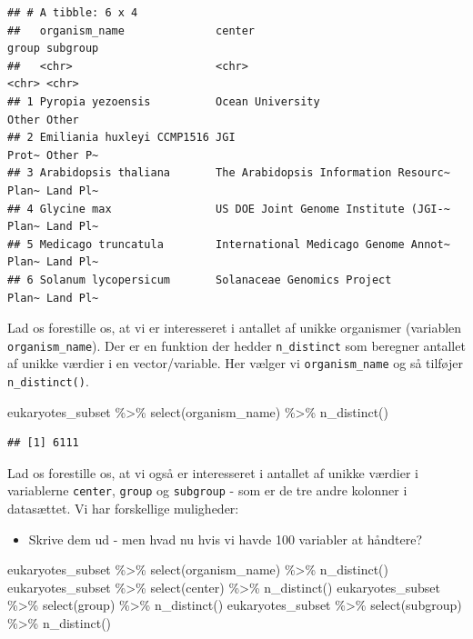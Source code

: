 \documentclass[
]{book}
\newenvironment{Shaded}{\begin{snugshade}}{\end{snugshade}}
\newcommand{\FunctionTok}[1]{\textcolor[rgb]{0.00,0.00,0.00}{#1}}
\newcommand{\NormalTok}[1]{#1}
\newcommand{\SpecialCharTok}[1]{\textcolor[rgb]{0.00,0.00,0.00}{#1}}
\providecommand{\tightlist}{%
  \setlength{\itemsep}{0pt}\setlength{\parskip}{0pt}}
\begin{document}
\begin{verbatim}
## # A tibble: 6 x 4
##   organism_name              center                               group subgroup
##   <chr>                      <chr>                                <chr> <chr>   
## 1 Pyropia yezoensis          Ocean University                     Other Other   
## 2 Emiliania huxleyi CCMP1516 JGI                                  Prot~ Other P~
## 3 Arabidopsis thaliana       The Arabidopsis Information Resourc~ Plan~ Land Pl~
## 4 Glycine max                US DOE Joint Genome Institute (JGI-~ Plan~ Land Pl~
## 5 Medicago truncatula        International Medicago Genome Annot~ Plan~ Land Pl~
## 6 Solanum lycopersicum       Solanaceae Genomics Project          Plan~ Land Pl~
\end{verbatim}

Lad os forestille os, at vi er interesseret i antallet af unikke organismer (variablen \texttt{organism\_name}). Der er en funktion der hedder \texttt{n\_distinct} som beregner antallet af unikke værdier i en vector/variable. Her vælger vi \texttt{organism\_name} og så tilføjer \texttt{n\_distinct()}.

\begin{Shaded}
\begin{Highlighting}[]
\NormalTok{eukaryotes\_subset }\SpecialCharTok{\%\textgreater{}\%} 
  \FunctionTok{select}\NormalTok{(organism\_name) }\SpecialCharTok{\%\textgreater{}\%} 
  \FunctionTok{n\_distinct}\NormalTok{()}
\end{Highlighting}
\end{Shaded}

\begin{verbatim}
## [1] 6111
\end{verbatim}

Lad os forestille os, at vi også er interesseret i antallet af unikke værdier i variablerne \texttt{center}, \texttt{group} og \texttt{subgroup} - som er de tre andre kolonner i datasættet. Vi har forskellige muligheder:

\begin{itemize}
\tightlist
\item
  Skrive dem ud - men hvad nu hvis vi havde 100 variabler at håndtere?
\end{itemize}

\begin{Shaded}
\begin{Highlighting}[]
\NormalTok{eukaryotes\_subset }\SpecialCharTok{\%\textgreater{}\%} \FunctionTok{select}\NormalTok{(organism\_name) }\SpecialCharTok{\%\textgreater{}\%} \FunctionTok{n\_distinct}\NormalTok{()}
\NormalTok{eukaryotes\_subset }\SpecialCharTok{\%\textgreater{}\%} \FunctionTok{select}\NormalTok{(center) }\SpecialCharTok{\%\textgreater{}\%} \FunctionTok{n\_distinct}\NormalTok{()}
\NormalTok{eukaryotes\_subset }\SpecialCharTok{\%\textgreater{}\%} \FunctionTok{select}\NormalTok{(group) }\SpecialCharTok{\%\textgreater{}\%} \FunctionTok{n\_distinct}\NormalTok{()}
\NormalTok{eukaryotes\_subset }\SpecialCharTok{\%\textgreater{}\%} \FunctionTok{select}\NormalTok{(subgroup) }\SpecialCharTok{\%\textgreater{}\%} \FunctionTok{n\_distinct}\NormalTok{()}
\end{Highlighting}
\end{Shaded}
\end{document}
